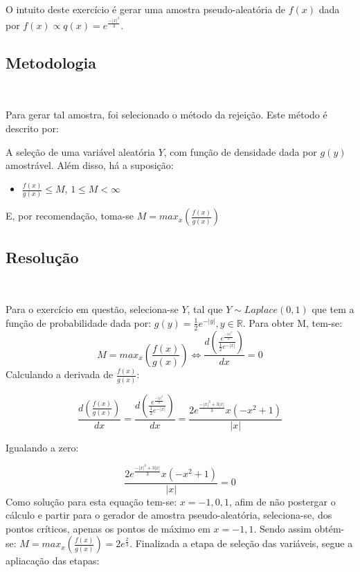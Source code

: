 \documentclass[11pt,]{article}
\providecommand{\tightlist}{%
  \setlength{\itemsep}{0pt}\setlength{\parskip}{0pt}}
\begin{document}
O intuito deste exercício é gerar uma amostra pseudo-aleatória de
\(f(x)\) dada por \(f(x) \propto q(x) = e^{\frac{-|x|^3}{3}}\).

\hypertarget{metodologia}{%
\subsection{Metodologia}\label{metodologia}}

~

Para gerar tal amostra, foi selecionado o método da rejeição. Este
método é descrito por:

A seleção de uma variável aleatória \(Y\), com função de densidade dada
por \(g(y)\) amostrável. Além disso, há a suposição:

\begin{itemize}
\tightlist
\item
  \(\frac{f(x)}{g(x)} \leq M\), \(1 \leq M < \infty\)
\end{itemize}

E, por recomendação, toma-se
\(M = max_x\left( \frac{f(x)}{g(x)} \right)\)

\hypertarget{resoluuxe7uxe3o}{%
\subsection{Resolução}\label{resoluuxe7uxe3o}}

~

Para o exercício em questão, seleciona-se \(Y\), tal que
\(Y \sim Laplace(0,1)\) que tem a função de probabilidade dada por:
\(g(y) = \frac{1}{2} e^{-|y|}, y \in \mathbb{R}\). Para obter M, tem-se:
\[M = max_x\left( \frac{f(x)}{g(x)} \right) \iff \frac{d\left(\frac{e^{\frac{-|x|^3}{3}}}{\frac{1}{2} e^{-|x|}}  \right)}{dx} = 0\]
Calculando a derivada de \(\frac{f(x)}{g(x)}\):

\[
\frac{d\left(\frac{f(x)}{g(x)}
\right)}{dx} =
\frac{d\left(\frac{e^{\frac{-|x|^3}{3}}}{\frac{1}{2} e^{-|x|}}  \right)}{dx} =
\frac{2e^{\frac{-|x|^3+3|x|}{3}}x(-x^2+1)}{|x|}
\]

Igualando a zero:

\[\frac{2e^{\frac{-|x|^3+3|x|}{3}}x(-x^2+1)}{|x|} = 0\] Como solução
para esta equação tem-se: \(x = -1, 0, 1\), afim de não postergar o
cálculo e partir para o gerador de amostra pseudo-aleatória,
seleciona-se, dos pontos críticos, apenas os pontos de máximo em
\(x = -1, 1\). Sendo assim obtém-se:
\(M = max_x\left( \frac{f(x)}{g(x)} \right) = 2e^{\frac{2}{3}}\).
Finalizada a etapa de seleção das variáveis, segue a apliacação das
etapas:
\end{document}
